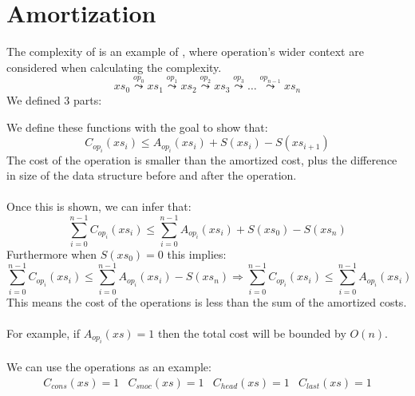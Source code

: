 \documentclass{report}
\begin{document}
        \section*{Amortization}
            The complexity of  is an example of , where operation's wider context are considered when calculating the complexity.
            \[xs_0 \overset{op_0}{\leadsto} xs_1 \overset{op_1}{\leadsto} xs_2 \overset{op_2}{\leadsto} xs_3 \overset{op_3}{\leadsto} \dots \overset{op_{n-1}}{\leadsto} xs_n\]
            We defined 3 parts:
            \begin{enumerate}
            \end{enumerate}
            We define these functions with the goal to show that:
            \[C_{op_i}(xs_i) \leq A_{op_i} (xs_i) + S(xs_i) - S(xs_{i+1})\]
            The cost of the operation is smaller than the amortized cost, plus the difference in size of the data structure before and after the operation.
            \\
            \\ Once this is shown, we can infer that:
            \[\sum^{n-1}_{i=0}C_{op_i}(xs_i) \leq \sum^{n-1}_{i=0}A_{op_i}(xs_i) + S(xs_0) - S(xs_n)\]
            Furthermore when $S(xs_0) = 0$ this implies:
            \[\sum^{n-1}_{i=0}C_{op_i}(xs_i) \leq \sum^{n-1}_{i=0}A_{op_i}(xs_i) - S(xs_n) \Rightarrow \sum^{n-1}_{i=0}C_{op_i}(xs_i) \leq \sum^{n-1}_{i=0}A_{op_i}(xs_i)\]
            This means the cost of the operations is less than the sum of the amortized costs.
            \\
            \\ For example, if $A_{op_i}(xs) = 1$ then the total cost will be bounded by $O(n)$.
            \\
            \\ We can use the  operations as an example:
            \[\begin{matrix}
                C_{cons}(xs) = 1 & C_{snoc}(xs) = 1 & C_{head}(xs) = 1 & C_{last}(xs) = 1 \\
            \end{matrix}\]
\end{document}

